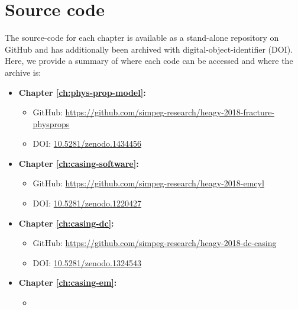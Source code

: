 \chapter{Source code}
\label{app:code_list}

The source-code for each chapter is available as a stand-alone repository on GitHub and has additionally been archived with digital-object-identifier (DOI). Here, we provide a summary of where each code can be accessed and where the archive is:

\begin{itemize}
    \item{\textbf{Chapter \ref{ch:phys-prop-model}:}
        \begin{itemize}
            \item{
                GitHub: \href{https://github.com/simpeg-research/heagy-2018-fracture-physprops}{https://github.com/simpeg-research/heagy-2018-fracture-physprops}
            }
            \item{
                DOI: \href{https://doi.org/10.5281/zenodo.1434456}{10.5281/zenodo.1434456}
            }
        \end{itemize}
    }
    \item{\textbf{Chapter \ref{ch:casing-software}:}
        \begin{itemize}
            \item{
                GitHub: \href{https://github.com/simpeg-research/heagy-2018-emcyl}{https://github.com/simpeg-research/heagy-2018-emcyl}
            }
            \item{
                DOI: \href{https://doi.org/10.5281/zenodo.1220427}{10.5281/zenodo.1220427}
            }
        \end{itemize}
    }
    \item{\textbf{Chapter \ref{ch:casing-dc}:}
        \begin{itemize}
            \item{
                GitHub: \href{https://github.com/simpeg-research/heagy-2018-dc-casing}{https://github.com/simpeg-research/heagy-2018-dc-casing}
            }
            \item{
                DOI: \href{https://doi.org/10.5281/zenodo.1324543}{10.5281/zenodo.1324543}
            }
        \end{itemize}
    }
    \item{\textbf{Chapter \ref{ch:casing-em}:}
        \begin{itemize}
            \item{
}
\end{itemize}}
\end{itemize}
